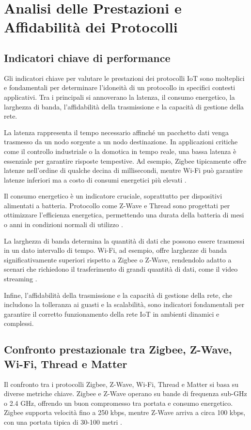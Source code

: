 \chapter{Analisi delle Prestazioni e Affidabilità dei Protocolli}

\section{Indicatori chiave di performance}
Gli indicatori chiave per valutare le prestazioni dei protocolli IoT sono molteplici e fondamentali per determinare l’idoneità di un protocollo in specifici contesti applicativi. Tra i principali si annoverano la latenza, il consumo energetico, la larghezza di banda, l’affidabilità della trasmissione e la capacità di gestione della rete.

La latenza rappresenta il tempo necessario affinché un pacchetto dati venga trasmesso da un nodo sorgente a un nodo destinazione. In applicazioni critiche come il controllo industriale o la domotica in tempo reale, una bassa latenza è essenziale per garantire risposte tempestive. Ad esempio, Zigbee tipicamente offre latenze nell’ordine di qualche decina di millisecondi, mentre Wi-Fi può garantire latenze inferiori ma a costo di consumi energetici più elevati \cite{ZigbeeLatencyStudy}.

Il consumo energetico è un indicatore cruciale, soprattutto per dispositivi alimentati a batteria. Protocollo come Z-Wave e Thread sono progettati per ottimizzare l’efficienza energetica, permettendo una durata della batteria di mesi o anni in condizioni normali di utilizzo \cite{EnergyEfficientProtocols}.

La larghezza di banda determina la quantità di dati che possono essere trasmessi in un dato intervallo di tempo. Wi-Fi, ad esempio, offre larghezze di banda significativamente superiori rispetto a Zigbee o Z-Wave, rendendolo adatto a scenari che richiedono il trasferimento di grandi quantità di dati, come il video streaming \cite{WiFiBandwidth}.

Infine, l’affidabilità della trasmissione e la capacità di gestione della rete, che includono la tolleranza ai guasti e la scalabilità, sono indicatori fondamentali per garantire il corretto funzionamento della rete IoT in ambienti dinamici e complessi.

\section{Confronto prestazionale tra Zigbee, Z-Wave, Wi-Fi, Thread e Matter}
Il confronto tra i protocolli Zigbee, Z-Wave, Wi-Fi, Thread e Matter si basa su diverse metriche chiave. Zigbee e Z-Wave operano su bande di frequenza sub-GHz o 2.4 GHz, offrendo un buon compromesso tra portata e consumo energetico. Zigbee supporta velocità fino a 250 kbps, mentre Z-Wave arriva a circa 100 kbps, con una portata tipica di 30-100 metri \cite{ZWaveVsZigbee}.

